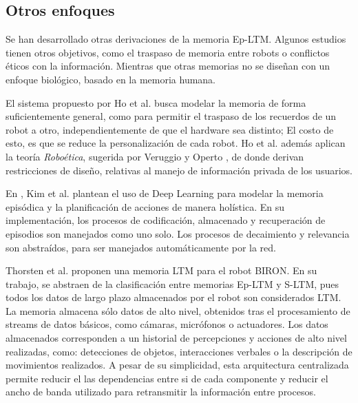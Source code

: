



\subsection{Otros enfoques}

Se han desarrollado otras derivaciones de la memoria Ep-LTM. Algunos estudios tienen otros objetivos, como el traspaso de memoria entre robots o conflictos éticos con la información. Mientras que otras memorias no se diseñan con un enfoque biológico, basado en la memoria humana.

El sistema propuesto por Ho et al. \cite{Ho2009} busca modelar la memoria de forma suficientemente general, como para permitir el traspaso de los recuerdos de un robot a otro, independientemente de que el hardware sea distinto; El costo de esto, es que se reduce la personalización de cada robot. Ho et al. además aplican la teoría \textit{Roboética}, sugerida por Veruggio y Operto \cite{Veruggio2006}, de donde derivan restricciones de diseño, relativas al manejo de información privada de los usuarios.

En \cite{KimMinJoo2016}, Kim et al. plantean el uso de Deep Learning para modelar la memoria episódica y la planificación de acciones de manera holística. En su implementación, los procesos de codificación, almacenado y recuperación de episodios son manejados como uno solo. Los procesos de decaimiento y relevancia son abstraídos, para ser manejados automáticamente por la red.

Thorsten et al. \cite{Spexard2008} proponen una memoria LTM para el robot BIRON. En su trabajo, se abstraen de la clasificación entre memorias Ep-LTM y S-LTM, pues todos los datos de largo plazo almacenados por el robot son considerados LTM. La memoria almacena sólo datos de alto nivel, obtenidos tras el procesamiento de streams de datos básicos, como cámaras, micrófonos o actuadores. Los datos almacenados corresponden a un historial de percepciones y acciones de alto nivel realizadas, como: detecciones de objetos, interacciones verbales o la descripción de movimientos realizados. A pesar de su simplicidad, esta arquitectura centralizada permite reducir el las dependencias entre si de cada componente y reducir el ancho de banda utilizado para retransmitir la información entre procesos.






